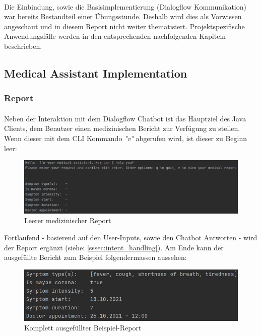 \documentclass[11pt,a4paper]{article}
\begin{document}
		\paragraph{}
			Die Einbindung, sowie die Basisimplementierung (Dialogflow Kommunikation) war bereits Bestandteil einer Übungsstunde.
			Deshalb wird dies als Vorwissen angeschaut und in diesem Report nicht weiter thematisiert. Projektspezifische Anwendungsfälle
			werden in den entsprechenden nachfolgenden Kapiteln beschrieben.
	
	\subsection{Medical Assistant Implementation}
		\subsubsection{Report}
			\paragraph{}
				Neben der Interaktion mit dem Dialogflow Chatbot ist das Hauptziel des Java Clients, dem Benutzer einen medizinischen 
				Bericht zur Verfügung zu stellen. Wenn dieser mit dem CLI Kommando \emph{"v"} abgerufen wird, ist dieser zu Beginn leer:
				\begin{figure}[h!]
					\begin{center}
        	    		\includegraphics[width=1.0\linewidth]{JavaClient-EmptyReport.png}
		    	        \caption{Leerer medizinischer Report}
		        	    \label{fig:javaClient_emptyReport}
					\end{center}
		        \end{figure}
		        
		        
		        \newpage
		        
		        
	        	Fortlaufend - basierend auf den User-Inputs, sowie den Chatbot Antworten - wird der Report ergänzt (siehe:
	        	\ref{sssec:intent_handling}). Am Ende kann der ausgefüllte Bericht zum Beispiel folgendermassen aussehen:
				\begin{figure}[h!]
					\begin{center}
        	    		\includegraphics[width=0.8\linewidth]{JavaClient-CompletedReport.png}
		    	        \caption{Komplett ausgefüllter Beispiel-Report}
		        	    \label{fig:javaClient_completedReport}
					\end{center}
		        \end{figure}
		
\end{document}
